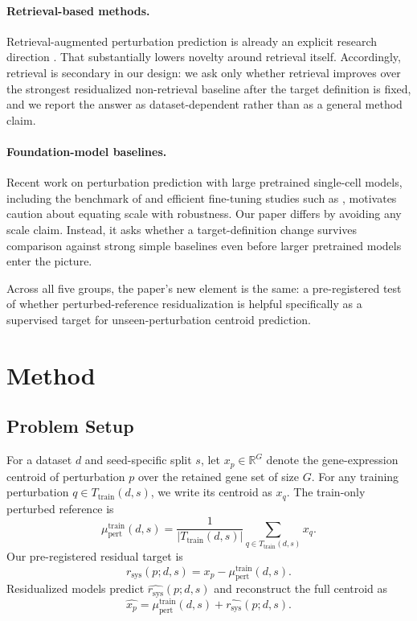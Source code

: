 \documentclass{article}
\newcommand{\xcent}[1]{x_{#1}}
\newcommand{\xpert}{\xcent{p}}
\newcommand{\mup}{\mu_{\mathrm{pert}}^{\mathrm{train}}}
\newcommand{\rsys}{r_{\mathrm{sys}}}
\begin{document}
\paragraph{Retrieval-based methods.}
Retrieval-augmented perturbation prediction is already an explicit research direction \citep{difrancesco2026ptrag}. That substantially lowers novelty around retrieval itself. Accordingly, retrieval is secondary in our design: we ask only whether retrieval improves over the strongest residualized non-retrieval baseline after the target definition is fixed, and we report the answer as dataset-dependent rather than as a general method claim.

\paragraph{Foundation-model baselines.}
Recent work on perturbation prediction with large pretrained single-cell models, including the benchmark of \citet{csendes2025benchmarking} and efficient fine-tuning studies such as \citet{maleki2024efficient}, motivates caution about equating scale with robustness. Our paper differs by avoiding any scale claim. Instead, it asks whether a target-definition change survives comparison against strong simple baselines even before larger pretrained models enter the picture.

Across all five groups, the paper's new element is the same: a pre-registered test of whether perturbed-reference residualization is helpful specifically as a supervised target for unseen-perturbation centroid prediction.

\section{Method}
\label{sec:method}

\subsection{Problem Setup}

For a dataset $d$ and seed-specific split $s$, let $\xcent{p} \in \mathbb{R}^G$ denote the gene-expression centroid of perturbation $p$ over the retained gene set of size $G$. For any training perturbation $q \in T_{\mathrm{train}}(d,s)$, we write its centroid as $\xcent{q}$. The train-only perturbed reference is
\begin{equation}
\mup(d,s)=\frac{1}{|T_{\mathrm{train}}(d,s)|}\sum_{q \in T_{\mathrm{train}}(d,s)} \xcent{q}.
\end{equation}
Our pre-registered residual target is
\begin{equation}
\rsys(p;d,s)=\xpert-\mup(d,s).
\end{equation}
Residualized models predict $\widehat{\rsys}(p;d,s)$ and reconstruct the full centroid as
\begin{equation}
\widehat{\xcent{p}}=\mup(d,s)+\widehat{\rsys}(p;d,s).
\end{equation}
\end{document}
